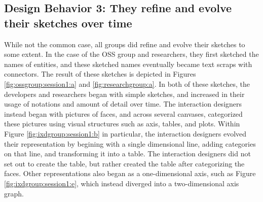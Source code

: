 %
%
%
%
%
%
%
%

\subsection{Design Behavior 3: They refine and evolve their sketches over time}

While not the common case, all groups did refine and evolve their sketches to some extent. In the case of the OSS group and researchers, they first sketched the names of entities, and these sketched names eventually became text scraps with connectors. The result of these sketches is depicted in Figures \ref{fig:ossgroup:session1:a} and \ref{fig:researchgroup:a}. In both of these sketches, the developers and researchers began with simple sketches, and increased in their usage of notations and amount of detail over time. The interaction designers instead began with pictures of faces, and across several canvases, categorized these pictures using visual structures such as axis, tables, and plots. Within Figure \ref{fig:ixdgroup:session1:b} in particular, the interaction designers evolved their representation by begining with a single dimensional line, adding categories on that line, and transforming it into a table. The interaction designers did not set out to create the table, but rather created the table after categorizing the faces. Other representations also began as a one-dimensional axis, such as Figure \ref{fig:ixdgroup:session1:e}, which instead diverged into a two-dimensional axis graph.

